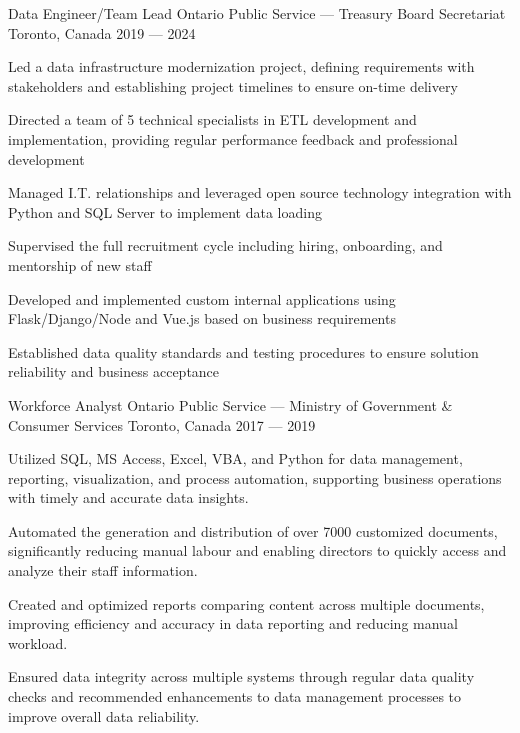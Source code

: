 \begin{cventries}
\cventry%
  {Data Engineer/Team Lead}
  {Ontario Public Service --- Treasury Board Secretariat}
  {Toronto, Canada}
  {2019 --- 2024}
  {
    \begin{cvitems}
      \item Led a data infrastructure modernization project, defining requirements with stakeholders and establishing project timelines to ensure on-time delivery
      \item Directed a team of 5 technical specialists in ETL development and implementation, providing regular performance feedback and professional development
      \item Managed I.T. relationships and leveraged open source technology integration with Python and SQL Server to implement data loading
      \item Supervised the full recruitment cycle including hiring, onboarding, and mentorship of new staff
      \item Developed and implemented custom internal applications using Flask/Django/Node and Vue.js based on business requirements
      \item Established data quality standards and testing procedures to ensure solution reliability and business acceptance
    \end{cvitems}
  }

\cventry%
  {Workforce Analyst}
  {Ontario Public Service --- Ministry of Government \& Consumer Services}
  {Toronto, Canada}
  {2017 --- 2019}
  {
    \begin{cvitems}
      \item Utilized SQL, MS Access, Excel, VBA, and Python for data management, reporting, visualization, and process automation, supporting business operations with timely and accurate data insights.
      \item Automated the generation and distribution of over 7000 customized documents, significantly reducing manual labour and enabling directors to quickly access and analyze their staff information.
      \item Created and optimized reports comparing content across multiple documents, improving efficiency and accuracy in data reporting and reducing manual workload.
      \item Ensured data integrity across multiple systems through regular data quality checks and recommended enhancements to data management processes to improve overall data reliability.
    \end{cvitems}
  }


\end{cventries}
